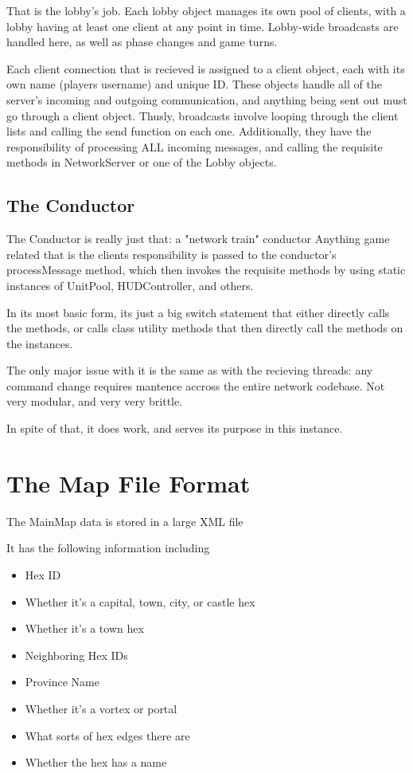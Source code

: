 \documentclass[12pt,a4paper]{article}
\begin{document}
That is the lobby's job. Each lobby object manages its own pool of clients, with a lobby having at least one client at any point in time. 
Lobby-wide broadcasts are handled here, as well as phase changes and game turns. 

Each client connection that is recieved is assigned to a client object, each with its own name (players username) and unique ID. These objects handle all of the server's incoming and outgoing communication, and anything being sent out must go through a client object. Thusly, broadcasts involve looping through the client lists and calling the send function on each one.
Additionally, they have the responsibility of processing ALL incoming messages, and calling the requisite methods in NetworkServer or one of the Lobby objects.

\subsection{The Conductor}

The Conductor is really just that: a "network train" conductor
Anything game related that is the clients responsibility is passed to the conductor's processMessage method, which then invokes the requisite methods by using static instances of UnitPool, HUDController, and others. 

In its most basic form, its just a big switch statement that either directly calls the methods, or calls class utility methods that then directly call the methods on the instances.

The only major issue with it is the same as with the recieving threads: any command change requires mantence accross the entire network codebase. Not very modular, and very very brittle. 

In spite of that, it does work, and serves its purpose in this instance. 



\section{The Map File Format}
The MainMap data is stored in a large XML file

It has the following information including 

\begin{itemize}
\item{Hex ID}
\item{Whether it's a capital, town, city, or castle hex}
\item{Whether it's a town hex}
\item{Neighboring Hex IDs}
\item{Province Name}
\item{Whether it's a vortex or portal}
\item{What sorts of hex edges there are}
\item{Whether the hex has a name}
\end{itemize}
\end{document}
